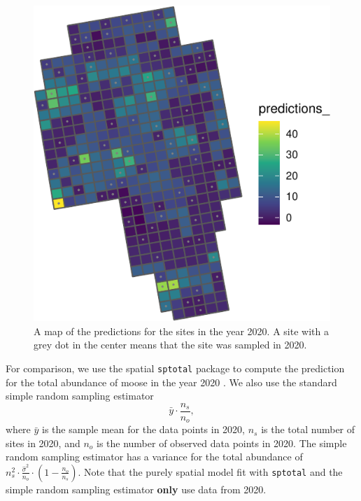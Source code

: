 \documentclass[]{interact}
\theoremstyle{plain}%
\theoremstyle{definition}
\theoremstyle{remark}
\begin{document}
\begin{figure}
\centering
\includegraphics{fpspatiotemp_manu_files/figure-latex/unnamed-chunk-8-1.pdf}
\caption{\label{fig:sitepredmap} A map of the predictions for the sites
in the year 2020. A site with a grey dot in the center means that the
site was sampled in 2020.}
\end{figure}

For comparison, we use the spatial \texttt{sptotal} package
\citep{higham2021sptotal} to compute the prediction for the total
abundance of moose in the year 2020 \citep{ver2008spatial}. We also use
the standard simple random sampling estimator \mbox{} \begin{equation*}
\bar{y} \cdot \frac{n_s}{n_{o}},
\end{equation*} \noindent where \(\bar{y}\) is the sample mean for the
data points in 2020, \(n_s\) is the total number of sites in 2020, and
\(n_o\) is the number of observed data points in 2020. The simple random
sampling estimator has a variance for the total abundance of
\(n_s^2 \cdot \frac{\hat{\sigma}^2}{n_o} \cdot (1 - \frac{n_o}{n_s})\).
Note that the purely spatial model fit with \texttt{sptotal} and the
simple random sampling estimator \textbf{only} use data from 2020.
\end{document}
